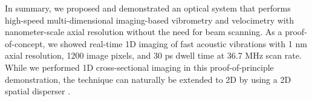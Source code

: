 In summary, we proposed and demonstrated an optical system that performs high-speed multi-dimensional imaging-based vibrometry and velocimetry with nanometer-scale axial resolution without the need for beam scanning. As a proof-of-concept, we showed real-time 1D imaging of fast acoustic vibrations with 1 nm axial resolution, 1200 image pixels, and 30 ps dwell time at 36.7 MHz scan rate. While we performed 1D cross-sectional imaging in this proof-of-principle demonstration, the technique can naturally be extended to 2D by using a 2D spatial disperser \cite{goda2009serial,tsia2010performance}.

